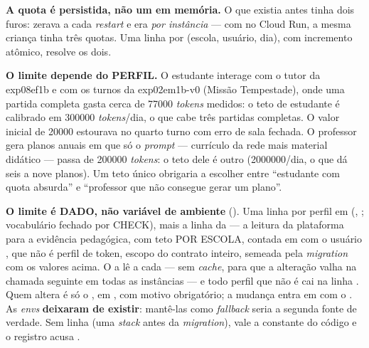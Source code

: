 \begin{decisao}
\textbf{A quota é persistida, não um  em memória.} O  que existia
antes tinha dois furos: zerava a cada \emph{restart} e era \emph{por instância}
--- com  no Cloud Run, a mesma criança tinha três quotas.
Uma linha por (escola, usuário, dia), com incremento atômico, resolve os dois.
\end{decisao}

\begin{decisao}
\textbf{O limite depende do PERFIL.} O estudante interage com o tutor da exp08ef1b
e com os turnos da exp02em1b-v0 (Missão Tempestade), onde uma partida completa gasta
cerca de \num{77000} \emph{tokens} medidos: o teto de estudante é calibrado em
\num{300000} \emph{tokens}/dia, o que cabe três partidas completas. O valor
inicial de \num{20000} estourava no quarto turno com erro de sala fechada. O
professor gera planos anuais em que só o \emph{prompt} --- currículo da rede
mais material didático --- passa de \num{200000} \emph{tokens}: o teto dele é
outro (\num{2000000}/dia, o que dá seis a nove planos). Um teto único obrigaria
a escolher entre \enquote{estudante com quota absurda} e \enquote{professor que
não consegue gerar um plano}.
\end{decisao}

\begin{decisao}
\textbf{O limite é DADO, não variável de ambiente} (). Uma linha
por perfil em  (, ; vocabulário
fechado por CHECK), mais a linha  da  --- a
leitura da plataforma para a evidência pedagógica, com teto POR ESCOLA, contada
em  com o usuário , que não é perfil de token, escopo do contrato inteiro, semeada pela \emph{migration}
com os valores acima. O  a lê a cada  --- sem
\emph{cache}, para que a alteração valha na chamada seguinte em todas as
instâncias --- e todo perfil que não é  cai na linha
. Quem altera é só o , em ,
com motivo obrigatório; a mudança entra em  com o
. As \emph{envs} 
\textbf{deixaram de existir}: mantê-las como \emph{fallback} seria a segunda
fonte de verdade. Sem linha (uma \emph{stack} antes da \emph{migration}), vale a
constante do código e o registro acusa .
\end{decisao}

